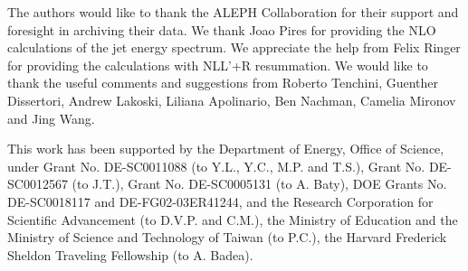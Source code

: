 \documentclass[aps,preprint,superscriptaddress,groupedaddress]{revtex4}  %
\newcommand{\fixme}[1]{{\color{red} [\textbf{#1}]}}
\begin{document}


\begin{acknowledgments}
The authors would like to thank the ALEPH Collaboration for their support and foresight in archiving their data. We thank Joao Pires for providing the NLO calculations of the jet energy spectrum. We appreciate the help from Felix Ringer for providing the calculations with NLL'+R resummation.  We would like to thank the useful comments and suggestions from Roberto Tenchini, Guenther Dissertori, Andrew Lakoski, Liliana Apolinario, Ben Nachman, Camelia Mironov and Jing Wang. 

This work has been supported by the Department of Energy, Office of Science, under Grant No. DE-SC0011088 (to Y.L., Y.C., M.P. and T.S.), Grant No. DE-SC0012567 (to J.T.), Grant No. DE-SC0005131 (to A. Baty), DOE Grants No. DE-SC0018117 and DE-FG02-03ER41244, and the Research Corporation for Scientific Advancement (to D.V.P. and C.M.), the Ministry of Education and the Ministry of Science and Technology of Taiwan (to P.C.), the Harvard Frederick Sheldon Traveling Fellowship (to A. Badea).%
\end{acknowledgments}


\end{document}
